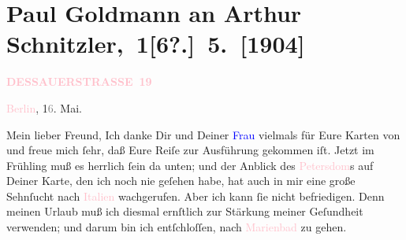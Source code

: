 

\renewcommand{\erwaehntePersonen}{Personen: Olga Schnitzler}
\renewcommand{\erwaehnteOrte}{Orte: Berlin, Dessauer Straße, Italien, Marienbad, Neapel, Palermo, Petersdom, Pompei, Rom, Taormina}
\renewcommand{\erwaehnteWerke}{}
\section[ Paul Goldmann an Arthur Schnitzler, 1{[}6?.{]} 5. {[}1904{]}]{Paul Goldmann an Arthur Schnitzler, 1{[}6?.{]} 5. {[}1904{]}}
\nopagebreak{}
\rehead{ }\normalsize\beginnumbering{}
\toendnotes[C]{\smallbreak\pagebreak[2]}
\toendnotes[C]{\smallbreak}
\pstart
           \noindent{}\raggedleft{}{\pb}\textcolor{gray}{\textbf{\textcolor{pink}{DESSAUERSTRASSE 19}{}\ledrightnote{\textcolor{pink}{Dessauer Straße}}}}\pend
           
\pstart
           \textcolor{pink}{Berlin}{}\ledrightnote{\textcolor{pink}{Berlin}}, 1\textcolor{gray}{6}. Mai.\pend
           
\pstart{}Mein lieber Freund,\pend
\pstart
           Ich danke Dir und Deiner \textcolor{blue}{Frau}{}\ledrightnote{{$\rightarrow$}\textcolor{blue}{Olga Schnitzler}}
               vielmals für Eure Karten von \label{K_L03443-1v}\label{K_L03443-1h} und
               freue mich ſehr, daß Eure Reiſe zur Ausführung gekommen iſt. Jetzt im Frühling muß es
               herrlich ſein da unten; und der Anblick des \textcolor{pink}{Petersdom}{}\ledrightnote{\textcolor{pink}{Petersdom}}s auf Deiner Karte, den ich noch nie geſehen habe, hat {\pb}auch in mir  eine große Sehnſucht nach \textcolor{pink}{Italien}{}\ledrightnote{\textcolor{pink}{Italien}}
               wachgerufen. Aber ich kann ſie nicht befriedigen. Denn meinen Urlaub muß ich diesmal
               ernſtlich zur Stärkung meiner Geſundheit verwenden; und darum bin ich entſchloſſen,
               nach \textcolor{pink}{Marienbad}{}\ledrightnote{\textcolor{pink}{Marienbad}} zu gehen.\pend
           
